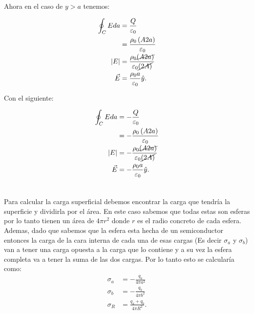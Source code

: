 \documentclass{report}
\begin{document}
Ahora en el caso de $y > a$ tenemos:
 
\begin{align*}
  \oint_{C} E da &= \frac{Q}{\varepsilon_0} \\ 
  &= \frac{\rho_0 \left( A 2a \right) }{\varepsilon_0} \\
  \left| E \right| &= \frac{\rho_0 \cancel{\left( A 2a \right) }}{\varepsilon_0 \cancel{\left( 2A \right) }} \\
  \vec{E} &= \frac{\rho_0 a}{\varepsilon_0} \hat{y}
.\end{align*}

Con el siguiente:

\begin{align*}
  \oint_{C} E da &=- \frac{Q}{\varepsilon_0} \\ 
  &=- \frac{\rho_0 \left( A 2a \right) }{\varepsilon_0} \\
  \left| E \right| &=- \frac{\rho_0 \cancel{\left( A 2a \right) }}{\varepsilon_0 \cancel{\left( 2A \right) }} \\
  \vec{E} &=- \frac{\rho_0 a}{\varepsilon_0} \hat{y}
.\end{align*}

\chapter{}

\section{}

Para calcular la carga superficial debemos encontrar la carga que tendría la superficie y dividirla por el área. En este caso sabemos que todas estas son esferas por lo tanto tienen un área de $4\pi r^2$ donde $r$ es el radio concreto de cada esfera. Ademas, dado que sabemos que la esfera esta hecha de un semiconductor entonces la carga de la cara interna de cada una de esas cargas (Es decir $\sigma_a$ y $\sigma_b$) van a tener una carga opuesta a la carga que lo contiene y a su vez la esfera completa va a tener la suma de las dos cargas. Por lo tanto esto se calcularía como:
\begin{align*}
  \sigma_a &= - \frac{q_a}{4\pi a^2} \\
  \sigma_b &= - \frac{q_b}{4\pi b^2} \\
  \sigma_R &= \frac{q_a + q_b}{4\pi R^2}
.\end{align*}

\section{}
\end{document}
